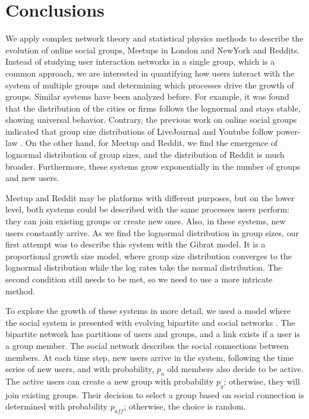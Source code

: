 \newpage
\section{Conclusions}

We apply complex network theory and statistical physics methods to describe the evolution of online social groups, Meetups in London and NewYork and Reddits. Instead of studying user interaction networks in a single group, which is a common approach, we are interested in quantifying how users interact with the system of multiple groups and determining which processes drive the growth of groups. Similar systems have been analyzed before. For example, it was found that the distribution of the cities or firms follows the lognormal and stays stable, showing universal behavior. Contrary, the previous work on online social groups indicated that group size distributions of LiveJournal and Youtube follow power-law \cite{zheleva2009co}. On the other hand, for Meetup and Reddit, we find the emergence of lognormal distribution of group sizes, and the distribution of Reddit is much broader. Furthermore, these systems grow exponentially in the number of groups and new users. 

Meetup and Reddit may be platforms with different purposes, but on the lower level, both systems could be described with the same processes users perform: they can join existing groups or create new ones. Also, in these systems, new users constantly arrive. As we find the lognormal distribution in group sizes, our first attempt was to describe this system with the Gibrat model. It is a proportional growth size model, where group size distribution converges to the lognormal distribution while the log rates take the normal distribution. The second condition still needs to be met, so we need to use a more intricate method.

To explore the growth of these systems in more detail, we used a model where the social system is presented with evolving bipartite and social networks \cite{zheleva2009co}. The bipartite network has partitions of users and groups, and a link exists if a user is a group member. The social network describes the social connections between members. At each time step, new users arrive in the system, following the time series of new users, and with probability, $p_a$ old members also decide to be active. The active users can create a new group with probability $p_g$; otherwise, they will join existing groups. Their decision to select a group based on social connection is determined with probability $p_{aff}$; otherwise, the choice is random.

